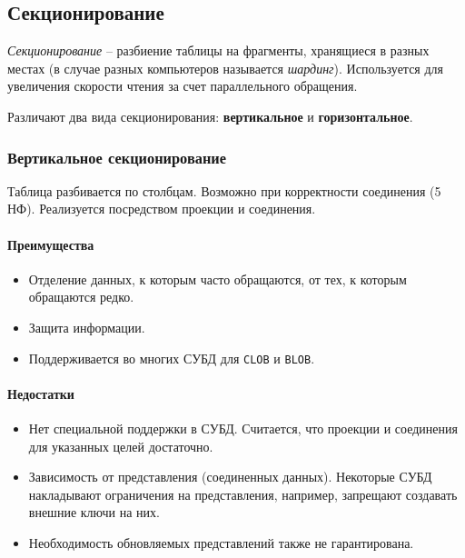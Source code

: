 \subsection{Секционирование}

\begin{definition}
	\textit{Секционирование} -- разбиение таблицы на фрагменты, хранящиеся в разных местах (в
	случае разных компьютеров называется \textit{шардинг}). Используется для увеличения скорости
	чтения за счет параллельного обращения.
\end{definition}

Различают два вида секционирования: \textbf{вертикальное} и \textbf{горизонтальное}.

\subsubsection{Вертикальное секционирование}

Таблица разбивается по столбцам. Возможно при корректности соединения (5 НФ). Реализуется
посредством проекции и соединения.

\paragraph{Преимущества}

\begin{itemize}
	\item Отделение данных, к которым часто обращаются, от тех, к которым обращаются редко.
	\item Защита информации.
	\item Поддерживается во многих СУБД для \texttt{CLOB} и \texttt{BLOB}.
\end{itemize}

\paragraph{Недостатки}

\begin{itemize}
	\item Нет специальной поддержки в СУБД. Считается, что проекции и соединения для указанных целей
	      достаточно.
	\item Зависимость от представления (соединенных данных). Некоторые СУБД накладывают ограничения на
	      представления, например, запрещают создавать внешние ключи на них.
	\item Необходимость обновляемых представлений также не гарантирована.
\end{itemize}

